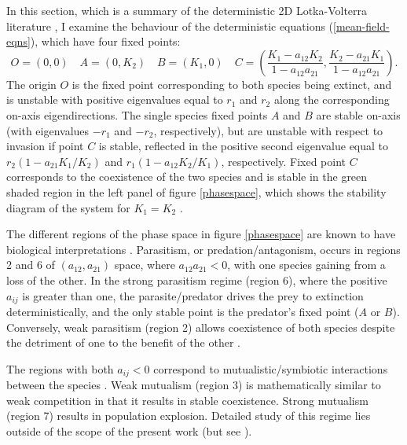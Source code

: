 In this section, which is a summary of the deterministic 2D Lotka-Volterra literature \cite{Neuhauser1999,Cox2010,Chotibut2015}, I examine the behaviour of the deterministic equations (\ref{mean-field-eqns}), which have four fixed points:
\begin{equation}
O = (0,0) \quad A = (0,K_2) \quad B = (K_1,0) \quad C = \left( \frac{K_1-a_{12} K_2}{1-a_{12}a_{21}},\frac{K_2-a_{21} K_1}{1-a_{12}a_{21}} \right). %
\end{equation}
The origin $O$ is the fixed point corresponding to both species being extinct, and is unstable with positive eigenvalues equal to $r_1$ and $r_2$ along the corresponding on-axis eigendirections. 
The single species fixed points $A$ and $B$ are stable on-axis (with eigenvalues $-r_1$ and $-r_2$, respectively), but are unstable with respect to invasion if point $C$ is stable, reflected in the positive second eigenvalue equal to $r_2(1-a_{21}K_1/K_2)$ and $r_1(1-a_{12}K_2/K_1)$, respectively. 
Fixed point $C$ corresponds to the coexistence of the two species and is stable in the green shaded region in the left panel of figure \ref{phasespace}, which shows the stability diagram of the system for $K_1=K_2$ \cite{Neuhauser1999,Cox2010,Chotibut2015}. %

The different regions of the phase space in figure \ref{phasespace} are known to have biological interpretations \cite{Abrams1977,Neuhauser1999,Cox2010}. 
Parasitism, or predation/antagonism, occurs in regions 2 and 6 of $(a_{12}, a_{21})$ space, where $a_{12}a_{21}<0$, with one species gaining from a loss of the other. 
In the strong parasitism regime (region 6), where the positive $a_{ij}$ is greater than one, the parasite/predator drives the prey to extinction deterministically, and the only stable point is the predator's fixed point ($A$ or $B$). 
Conversely, weak parasitism (region 2) allows coexistence of both species despite the detriment of one to the benefit of the other \cite{Neuhauser1999,Cox2010,Chotibut2015}. 

The regions with both $a_{ij}<0$ correspond to mutualistic/symbiotic interactions between the species \cite{Neuhauser1999,Cox2010,Chotibut2015}. %
Weak mutualism (region 3) is mathematically similar to weak competition in that it results in stable coexistence. 
Strong mutualism (region 7) results in population explosion. 
Detailed study of this regime lies outside of the scope of the present work (but see \cite{Meerson2008}).

